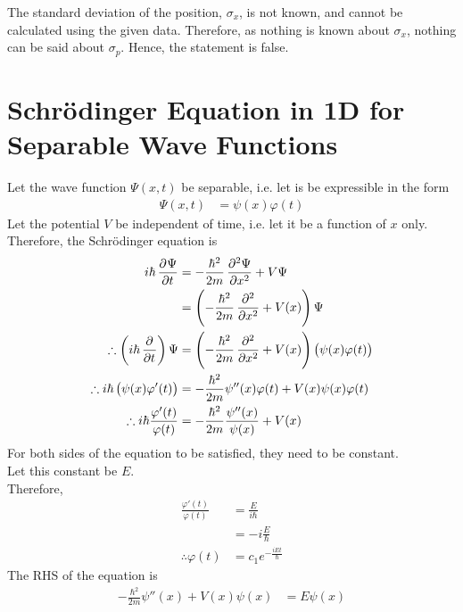 \documentclass[titlepage, fleqn, a4paper, 12pt, twoside]{article}
\theoremstyle{definition}
\theoremstyle{theorem}
\begin{document}
\begin{solution}
	The standard deviation of the position, $\sigma_x$, is not known, and cannot be calculated using the given data.
	Therefore, as nothing is known about $\sigma_x$, nothing can be said about $\sigma_p$.
	Hence, the statement is false.
\end{solution}

\section{Schrödinger Equation in 1D for Separable Wave Functions}

Let the wave function $\Psi(x,t)$ be separable, i.e. let is be expressible in the form
\begin{align*}
	\Psi(x,t) &= \psi(x) \varphi(t)
\end{align*}
Let the potential $V$ be independent of time, i.e. let it be a function of $x$ only.\\
Therefore, the Schrödinger equation is
\begin{align*}
	i \hbar \dpd{\Psi}{t} &= -\frac{\hbar^2}{2 m} \dpd[2]{\Psi}{x} + V \Psi\\
	&= \left( -\frac{\hbar^2}{2 m} \dpd[2]{}{x} + V(x) \right) \Psi\\
	\therefore \left( i \hbar \dpd{}{t} \right) \Psi &= \left( -\frac{\hbar^2}{2 m} \dpd[2]{}{x} + V(x) \right) \left( \psi(x) \varphi(t) \right)\\
	\therefore i \hbar \left( \psi(x) \varphi'(t) \right) &= -\frac{\hbar^2}{2 m} \psi''(x) \varphi(t) + V(x) \psi(x) \varphi(t)\\
	\therefore i \hbar \frac{\varphi'(t)}{\varphi(t)} &= -\frac{\hbar^2}{2 m} \frac{\psi''(x)}{\psi(x)} + V(x)
\end{align*}
For both sides of the equation to be satisfied, they need to be constant.\\
Let this constant be $E$.\\
Therefore,
\begin{align*}
	\frac{\varphi'(t)}{\varphi(t)} &= \frac{E}{i \hbar}\\
	&= -i \frac{E}{\hbar}\\
	\therefore \varphi(t) &= c_1 e^{-\frac{i E t}{\hbar}}
\end{align*}
The RHS of the equation is
\begin{align*}
	-\frac{\hbar^2}{2 m} \psi''(x) + V(x) \psi(x) &= E \psi(x)
\end{align*}
\end{document}
